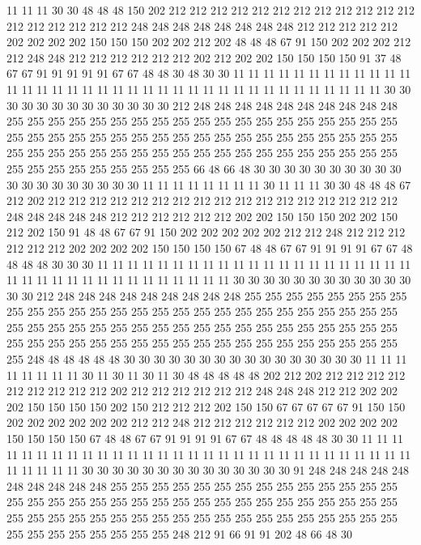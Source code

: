11 11 11 30 30 48 48 48 150 202 212 212 212 212 212 212 212 212 212 212
212 212 212 212 212 212 212 212 248 248 248 248 248 248 248 248 212 212 212 212
212 202 202 202 202 150 150 150 202 202 212 202 48 48 48 67 91 150 202 202
202 212 212 248 248 212 212 212 212 212 212 202 212 202 202 150 150 150 150 91
37 48 67 67 91 91 91 91 91 67 67 48 48 30 48 30 30 11 11 11
11 11 11 11 11 11 11 11 11 11 11 11 11 11 11 11 11 11 11 11
11 11 11 11 11 11 11 11 11 11 11 11 11 11 30 30 30 30 30 30
30 30 30 30 30 30 30 212 248 248 248 248 248 248 248 248 248 248 255 255
255 255 255 255 255 255 255 255 255 255 255 255 255 255 255 255 255 255 255 255
255 255 255 255 255 255 255 255 255 255 255 255 255 255 255 255 255 255 255 255
255 255 255 255 255 255 255 255 255 255 255 255 255 255 255 255 255 255 255 255
255 255 255 255 66 48 66 48 30 30 30 30 30 30 30 30 30 30 30 30
30 30 30 30 30 30 30 11 11 11 11 11 11 11 11 30 11 11 11 30
30 48 48 48 67 212 202 212 212 212 212 212 212 212 212 212 212 212 212 212
212 212 212 212 248 248 248 248 248 212 212 212 212 212 212 202 202 150 150 150
202 202 150 212 202 150 91 48 48 67 67 91 150 202 202 202 202 202 212 212
248 212 212 212 212 212 212 202 202 202 202 150 150 150 150 67 48 48 67 67
91 91 91 91 67 67 48 48 48 48 30 30 30 11 11 11 11 11 11 11
11 11 11 11 11 11 11 11 11 11 11 11 11 11 11 11 11 11 11 11
11 11 11 11 11 11 11 11 11 30 30 30 30 30 30 30 30 30 30 30
30 30 30 212 248 248 248 248 248 248 248 248 248 255 255 255 255 255 255 255
255 255 255 255 255 255 255 255 255 255 255 255 255 255 255 255 255 255 255 255
255 255 255 255 255 255 255 255 255 255 255 255 255 255 255 255 255 255 255 255
255 255 255 255 255 255 255 255 255 255 255 255 255 255 255 255 255 255 255 248
48 48 48 48 48 30 30 30 30 30 30 30 30 30 30 30 30 30 30 30
30 11 11 11 11 11 11 11 11 30 11 30 11 30 11 30 48 48 48 48
48 202 212 202 212 212 212 212 212 212 212 212 212 202 212 212 212 212 212 212
248 248 248 212 212 202 202 202 150 150 150 150 202 150 212 212 212 202 150 150
67 67 67 67 67 91 150 150 202 202 202 202 202 202 212 212 248 212 212 212
212 212 212 202 202 202 202 150 150 150 150 67 48 48 67 67 91 91 91 91
67 67 48 48 48 48 48 30 30 11 11 11 11 11 11 11 11 11 11 11
11 11 11 11 11 11 11 11 11 11 11 11 11 11 11 11 11 11 11 11
11 11 11 11 30 30 30 30 30 30 30 30 30 30 30 30 30 30 91 248
248 248 248 248 248 248 248 248 248 255 255 255 255 255 255 255 255 255 255 255
255 255 255 255 255 255 255 255 255 255 255 255 255 255 255 255 255 255 255 255
255 255 255 255 255 255 255 255 255 255 255 255 255 255 255 255 255 255 255 255
255 255 255 255 255 255 255 255 255 248 212 91 66 91 91 202 48 66 48 30
